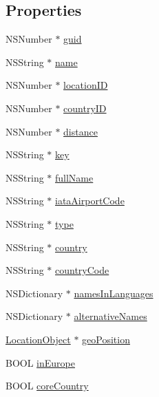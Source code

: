 \subsection*{Properties}
\begin{DoxyCompactItemize}
\item 
N\+S\+Number $\ast$ \hyperlink{interface_place_object_af018c73afed3d69e8b4e73399573292b}{guid}
\item 
N\+S\+String $\ast$ \hyperlink{interface_place_object_abf3f3dd0d2d7189755b09df41d332310}{name}
\item 
N\+S\+Number $\ast$ \hyperlink{interface_place_object_a6e60190f0f556c4cd990769720409262}{location\+ID}
\item 
N\+S\+Number $\ast$ \hyperlink{interface_place_object_a2c310e19df1c333e69ea623a07803159}{country\+ID}
\item 
N\+S\+Number $\ast$ \hyperlink{interface_place_object_a913be3e7487cc751bedf051efb200f0b}{distance}
\item 
N\+S\+String $\ast$ \hyperlink{interface_place_object_a9824d0bfb7028ed1e968ed6efe4614f4}{key}
\item 
N\+S\+String $\ast$ \hyperlink{interface_place_object_ad9712fd279caacdc1e6e859c789a8c89}{full\+Name}
\item 
N\+S\+String $\ast$ \hyperlink{interface_place_object_a08fa27864c0ab1622fd052775b78359e}{iata\+Airport\+Code}
\item 
N\+S\+String $\ast$ \hyperlink{interface_place_object_a4d1924fc2fb84097f452f47f66199661}{type}
\item 
N\+S\+String $\ast$ \hyperlink{interface_place_object_a51fc9bf5128ad1ae37c7f8520f2f8f4e}{country}
\item 
N\+S\+String $\ast$ \hyperlink{interface_place_object_ae97cadb12de29e5d532e7ebb17981cd0}{country\+Code}
\item 
N\+S\+Dictionary $\ast$ \hyperlink{interface_place_object_a29458bf7d479735b009bb5f3d72b24e5}{names\+In\+Languages}
\item 
N\+S\+Dictionary $\ast$ \hyperlink{interface_place_object_aadad1e36a7d18b4727d474392daaeef5}{alternative\+Names}
\item 
\hyperlink{interface_location_object}{Location\+Object} $\ast$ \hyperlink{interface_place_object_ab64dbbd07e30cb97604bfccb69bb6840}{geo\+Position}
\item 
B\+O\+OL \hyperlink{interface_place_object_adaa4d2067142d57960651197be872b6e}{in\+Europe}
\item 
B\+O\+OL \hyperlink{interface_place_object_a82afd62e7a54bcf853138961be0bdd4b}{core\+Country}
\end{DoxyCompactItemize}


